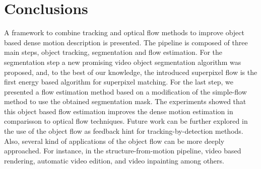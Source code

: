 \chapter{Conclusions} \label{chap:conclusion}

A framework to combine tracking and optical flow methods to improve 
object based dense motion description is presented. The pipeline is 
composed of three main steps, object tracking, segmentation and 
flow estimation. For the segmentation step a new promising video object 
segmentation algorithm was proposed, and, to the best of our knowledge, 
the introduced superpixel flow is the first energy based algorithm for superpixel matching.
For the last step, we presented a flow estimation method based on a modification of the simple-flow method to use 
the obtained segmentation mask. The experiments showed that this object based flow estimation improves the dense motion 
estimation in comparisson to optical flow techniques.
Future work can be further explored in the use of the object flow as feedback hint for tracking-by-detection methods. Also, 
several kind of applications of the object flow can be more deeply approached. For instance, 
in the structure-from-motion pipeline, video based rendering, automatic video edition, and video inpainting  among others.



